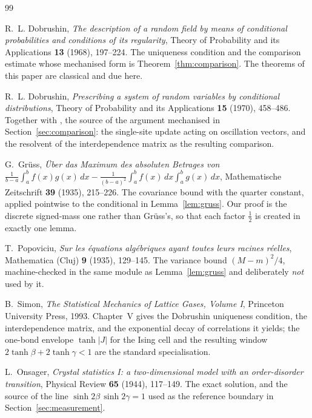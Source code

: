 \documentclass[11pt]{article}
\theoremstyle{definition}
\begin{document}
\begin{thebibliography}{99}

R.~L. Dobrushin,
\emph{The description of a random field by means of conditional probabilities
and conditions of its regularity},
Theory of Probability and its Applications \textbf{13} (1968), 197--224.
The uniqueness condition and the comparison estimate whose mechanised form is
Theorem~\ref{thm:comparison}.  The theorems of this paper are classical and due
here.

R.~L. Dobrushin,
\emph{Prescribing a system of random variables by conditional distributions},
Theory of Probability and its Applications \textbf{15} (1970), 458--486.
Together with \cite{Simon1993}, the source of the argument mechanised in
Section~\ref{sec:comparison}: the single-site update acting on oscillation
vectors, and the resolvent of the interdependence matrix as the resulting
comparison.

G.~Gr\"uss,
\emph{\"Uber das Maximum des absoluten Betrages von
$\frac{1}{b-a}\int_a^b f(x)g(x)\,dx-\frac{1}{(b-a)^2}\int_a^b f(x)\,dx\int_a^b
g(x)\,dx$},
Mathematische Zeitschrift \textbf{39} (1935), 215--226.
The covariance bound with the quarter constant, applied pointwise to the
conditional in Lemma~\ref{lem:gruss}.  Our proof is the discrete signed-mass
one rather than Gr\"uss's, so that each factor $\tfrac12$ is created in exactly
one lemma.

T.~Popoviciu,
\emph{Sur les \'equations alg\'ebriques ayant toutes leurs racines r\'eelles},
Mathematica (Cluj) \textbf{9} (1935), 129--145.
The variance bound $(M-m)^2/4$, machine-checked in the same module as
Lemma~\ref{lem:gruss} and deliberately \emph{not} used by it.

B.~Simon,
\emph{The Statistical Mechanics of Lattice Gases, Volume I},
Princeton University Press, 1993.
Chapter~V gives the Dobrushin uniqueness condition, the interdependence matrix,
and the exponential decay of correlations it yields; the one-bond envelope
$\tanh|J|$ for the Ising cell and the resulting window
$2\tanh\beta+2\tanh\gamma<1$ are the standard specialisation.

L.~Onsager,
\emph{Crystal statistics I: a two-dimensional model with an order-disorder
transition},
Physical Review \textbf{65} (1944), 117--149.
The exact solution, and the source of the line
$\sinh 2\beta\,\sinh 2\gamma=1$ used as the reference boundary in
Section~\ref{sec:measurement}.


\end{thebibliography}
\end{document}

